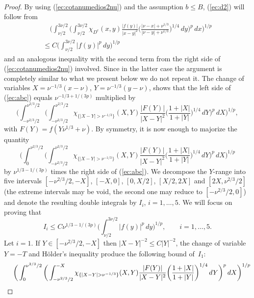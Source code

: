 \documentclass[leqno,a4paper]{amsart}
\begin{document}
\begin{proof}
By using (\ref{ec:cotanumedios2nu}) and the assumption $b\le B$,
(\ref{ec:d2}) will follow from
\begin{multline}
\label{ec:abc}
\quad
\bigg(\int_{\nu/2}^{3\nu/2}\bigg(\int_{\nu/2}^{3\nu/2}\chi_{D^c}(x,y)\frac{|f(y)|}
{|x-y|^2}\bigg(\frac{|\nu-x|+\nu^{1/3}}{|\nu-y|+\nu^{1/3}}\bigg)^{1/4}\,dy
\bigg)^p\,dx\bigg)^{1/p} \\
\le C\bigg(\int_{\nu/2}^{3\nu/2}|f(y)|^p\,dy\bigg)^{1/p}
\qquad
\end{multline}
and an analogous inequality with the second term from the right side of
(\ref{ec:cotanumedios2nu}) involved. Since in the latter case the argument is
completely similar to what we present below we do not repeat it.
The change of variables $X=\nu^{-1/3}(x-\nu)$,
$Y=\nu^{-1/3}(y-\nu)$, shows that the left side of (\ref{ec:abc}) equals
$\nu^{-1/3+1/(3p)}$ multiplied by
\begin{equation*}
\bigg(\int_{-\nu^{2/3}/2}^{\nu^{2/3}/2}\bigg(\int_{-\nu^{2/3}/2}
^{\nu^{2/3}/2}\chi_{\{|X-Y|>\nu^{-1/3}\}}(X,Y)\frac{|F(Y)|}{|X-Y|^2}
\bigg(\frac{1+|X|}{1+|Y|}\bigg)^{1/4}\,dY\bigg)^p\,dX\bigg)^{1/p},
\end{equation*}
with $F(Y)=f(Y\nu^{1/3}+\nu)$. By symmetry, it is now enough to majorize the
quantity
\begin{equation*}
\bigg(\int_{0}^{\nu^{2/3}/2}\bigg(\int_{-\nu^{2/3}/2}
^{\nu^{2/3}/2}\chi_{\{|X-Y|>\nu^{-1/3}\}}(X,Y)\frac{|F(Y)|}{|X-Y|^2}
\bigg(\frac{1+|X|}{1+|Y|}\bigg)^{1/4}\,dY\bigg)^p\,dX\bigg)^{1/p}
\end{equation*}
by $\nu^{1/3-1/(3p)}$ times the right side of (\ref{ec:abc}).
We decompose the $Y$-range into five intervals $[-\nu^{2/3}/2,-X]$,
$[-X,0]$, $[0,X/2]$, $[X/2,2X]$ and $[2X,\nu^{2/3}/2]$ (the extreme intervals
may be void, the second one may reduce to $[-\nu^{2/3}/2,0]$) and denote
the resulting double integrals by $I_i$, $i=1,\dots,5$. We will focus on
proving that
\begin{equation}
\label{ec:bbb}
I_i\le C\nu^{1/3-1/(3p)}\bigg(\int_{\nu/2}^{3\nu/2}|f(y)|^p\,dy
\bigg)^{1/p},\qquad i=1,\dots,5.
\end{equation}
Let $i=1$. If $Y\in [-\nu^{2/3}/2, -X]$ then $|X-Y|^{-2}\le C|Y|^{-2}$,
the change of variable $Y=-T$ and H\"older's inequality produce the following
bound of~$I_1$:
\begin{align*}
&\phantom{\null\le\null}
\bigg(\int_{0}^{\nu^{2/3}/2} \bigg(\int_{-\nu^{2/3}/2}^{-X}
\chi_{\{|X-Y|>\nu^{-1/3}\}}(X,Y)\frac{|F(Y)|}{|X-Y|^2}
\bigg(\frac{1+|X|}{1+|Y|}\bigg)^{1/4}\,dY\bigg)^p\,dX\bigg)^{1/p}\\

\end{align*}
\end{proof}
\end{document}
